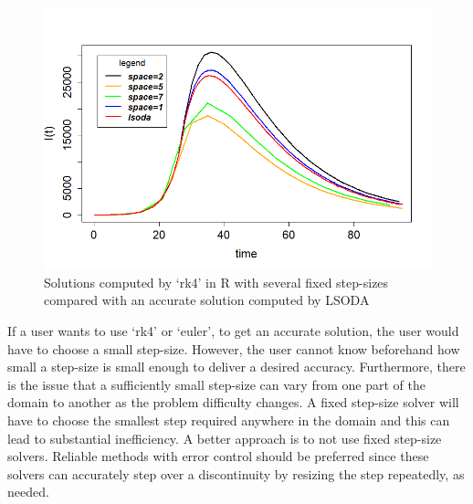 \begin{figure}[H]
\centering
\includegraphics[width=0.7\linewidth]{./figures/rk4_messing_up_no_event_R}
\caption{Solutions computed by `rk4' in R with several fixed step-sizes compared with an accurate solution computed by LSODA}
\label{fig:rk4_messing_up_no_event_R}
\end{figure}

If a user wants to use `rk4' or `euler', to get an accurate solution, the user would have to choose a small step-size. However, the user cannot know beforehand how small a step-size is small enough to deliver a desired accuracy. Furthermore, there is the issue that a sufficiently small step-size can vary from one part of the domain to another as the problem difficulty changes. A fixed step-size solver will have to choose the smallest step required anywhere in the domain and this can lead to substantial inefficiency. A better approach is to not use fixed step-size solvers. Reliable methods with error control should be preferred since these solvers can accurately step over a discontinuity by resizing the step repeatedly, as needed.

